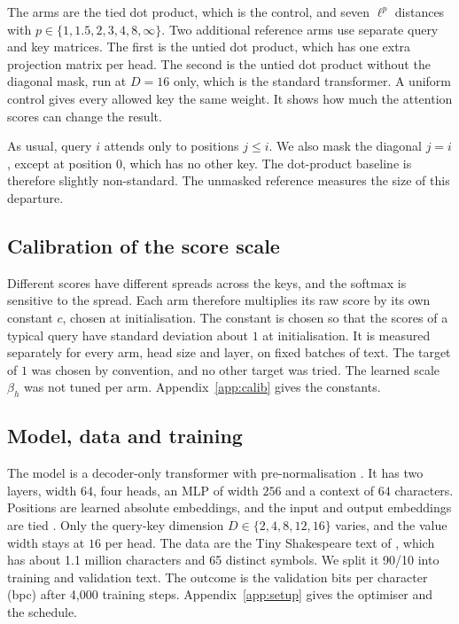 \documentclass[11pt]{article}
\begin{document}
The arms are the tied dot product, which is the control, and seven $\ell^p$ distances with $p\in\{1,1.5,2,3,4,8,\infty\}$.
Two additional reference arms use separate query and key matrices.
The first is the untied dot product, which has one extra projection matrix per head.
The second is the untied dot product without the diagonal mask, run at $D=16$ only, which is the standard transformer.
A uniform control gives every allowed key the same weight.
It shows how much the attention scores can change the result.

As usual, query $i$ attends only to positions $j\le i$.
We also mask the diagonal $j=i$, except at position $0$, which has no other key.
The dot-product baseline is therefore slightly non-standard.
The unmasked reference measures the size of this departure.

\subsection{Calibration of the score scale}\label{sec:calib}

Different scores have different spreads across the keys, and the softmax is sensitive to the spread.
Each arm therefore multiplies its raw score by its own constant $c$, chosen at initialisation.
The constant is chosen so that the scores of a typical query have standard deviation about $1$ at initialisation.
It is measured separately for every arm, head size and layer, on fixed batches of text.
The target of $1$ was chosen by convention, and no other target was tried.
The learned scale $\beta_h$ was not tuned per arm.
Appendix~\ref{app:calib} gives the constants.

\subsection{Model, data and training}

The model is a decoder-only transformer \citep{radford2019} with pre-normalisation \citep{xiong2020}.
It has two layers, width $64$, four heads, an MLP of width $256$ and a context of $64$ characters.
Positions are learned absolute embeddings, and the input and output embeddings are tied \citep{press2017}.
Only the query-key dimension $D\in\{2,4,8,12,16\}$ varies, and the value width stays at $16$ per head.
The data are the Tiny Shakespeare text of \citet{karpathy2015}, which has about 1.1 million characters and 65 distinct symbols.
We split it 90/10 into training and validation text.
The outcome is the validation bits per character (bpc) after 4,000 training steps.
Appendix~\ref{app:setup} gives the optimiser and the schedule.
\end{document}
